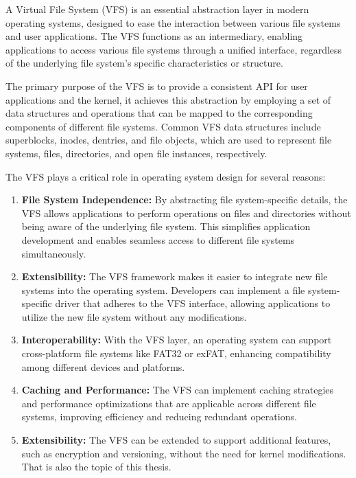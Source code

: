 A Virtual File System (VFS) is an essential abstraction layer in modern operating systems, designed to ease the interaction between various file systems and user applications.
The VFS functions as an intermediary, enabling applications to access various file systems through a unified interface, regardless of the underlying file system's specific characteristics or structure.

The primary purpose of the VFS is to provide a consistent API for user applications and the kernel, it achieves this abstraction by employing a set of data structures and operations that can be mapped to the corresponding components of different file systems.
Common VFS data structures include superblocks, inodes, dentries, and file objects, which are used to represent file systems, files, directories, and open file instances, respectively.

The VFS plays a critical role in operating system design for several reasons:

\begin{enumerate}
    \item \textbf{File System Independence:} By abstracting file system-specific details, the VFS allows applications to perform operations on files and directories without being aware of the underlying file system.
    This simplifies application development and enables seamless access to different file systems simultaneously.
    \item \textbf{Extensibility:} The VFS framework makes it easier to integrate new file systems into the operating system.
    Developers can implement a file system-specific driver that adheres to the VFS interface, allowing applications to utilize the new file system without any modifications.
    \item \textbf{Interoperability:} With the VFS layer, an operating system can support cross-platform file systems like FAT32 or exFAT, enhancing compatibility among different devices and platforms.
    \item \textbf{Caching and Performance:} The VFS can implement caching strategies and performance optimizations that are applicable across different file systems, improving efficiency and reducing redundant operations.
    \item \textbf{Extensibility:} The VFS can be extended to support additional features, such as encryption and versioning, without the need for kernel modifications.
    That is also the topic of this thesis.
\end{enumerate}

